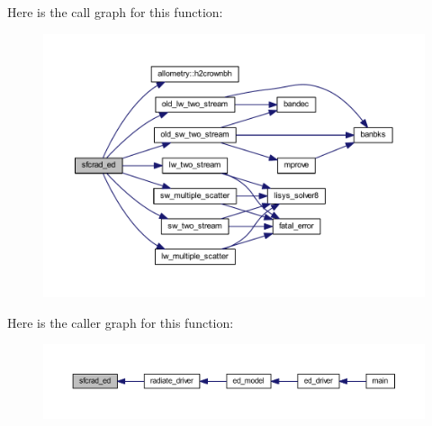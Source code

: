 Here is the call graph for this function\+:\nopagebreak
\begin{figure}[H]
\begin{center}
\leavevmode
\includegraphics[width=350pt]{radiate__driver_8f90_aa7642a6b7c3a9578373f6f05492956ec_cgraph}
\end{center}
\end{figure}




Here is the caller graph for this function\+:\nopagebreak
\begin{figure}[H]
\begin{center}
\leavevmode
\includegraphics[width=350pt]{radiate__driver_8f90_aa7642a6b7c3a9578373f6f05492956ec_icgraph}
\end{center}
\end{figure}


